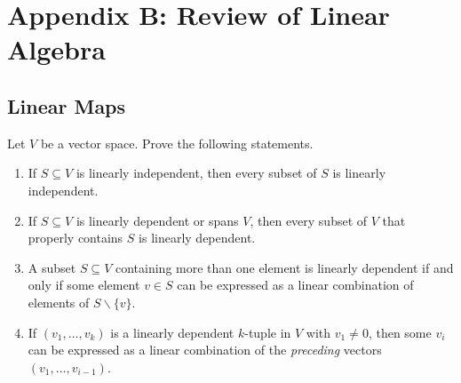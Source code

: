 \section{Appendix B: Review of Linear Algebra}

\subsection{Linear Maps}

\begin{exercise}
Let $V$ be a vector space. Prove the following statements.
\begin{enumerate}
\item[(a)] If $S\subseteq V$ is linearly independent, then every subset of $S$ is linearly independent.
\item[(b)] If $S\subseteq V$ is linearly dependent or spans $V$, then every subset of $V$ that properly contains $S$ is linearly dependent.
\item[(c)] A subset $S\subseteq V$ containing more than one element is linearly dependent if and only if some element $v\in S$ can be expressed as a linear combination of elements of $S\smallsetminus\{v\}$.
\item[(d)] If $(v_1,\ldots,v_k)$ is a linearly dependent $k$-tuple in $V$ with $v_1\ne 0$, then some $v_i$ can be expressed as a linear combination of the \emph{preceding} vectors $(v_1,\ldots,v_{i-1})$.
\end{enumerate}
\end{exercise}
